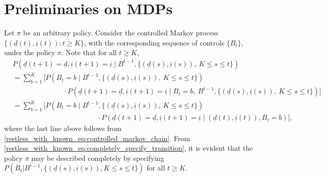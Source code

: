 \section{Preliminaries on MDPs}\label{restless_with_known_sec:MDP_preliminaries}
Let $\pi$ be an arbitrary policy. Consider the controlled Markov process $\{(\underline{d}(t),\underline{i}(t)):t\geq K\}$, with the corresponding sequence of controls $\{B_t\}$, under the policy $\pi$. Note that for all $t\geq K$,
\begin{align}
	&P(\underline{d}(t+1)=\underline{d},\underline{i}(t+1)=\underline{i}\mid B^{t-1}, \{(\underline{d}(s),\underline{i}(s)),~K\leq s\leq t\})\nonumber\\
	&=\sum\limits_{b=1}^{K}\bigg[P(B_t=b\mid B^{t-1}, \{(\underline{d}(s),\underline{i}(s)),~K\leq s\leq t\})\nonumber\\
	&\hspace{3cm} \cdot P(\underline{d}(t+1)=\underline{d},\underline{i}(t+1)=\underline{i}\mid B_t=b, ~B^{t-1}, \{(\underline{d}(s),\underline{i}(s)),~K\leq s\leq t\})\bigg]\nonumber\\
	&=\sum\limits_{b=1}^{K}\bigg[P(B_t=b\mid B^{t-1},\{(\underline{d}(s),\underline{i}(s)),~K\leq s\leq t\})\nonumber\\
	&\hspace{5cm}\cdot P(\underline{d}(t+1)=\underline{d},\underline{i}(t+1)=\underline{i}\mid (\underline{d}(t),\underline{i}(t)), B_t=b)\bigg],\label{restless_with_known_eq:completely_specify_transition}
\end{align}
where the last line above follows from \eqref{restless_with_known_eq:controlled_markov_chain}. From \eqref{restless_with_known_eq:completely_specify_transition}, it is evident that the policy $\pi$ may be described completely by specifying  $P(B_{t} | B^{t-1}, \{ (\underline{d}(s),\underline{i}(s)),K\leq s\leq t \})$ for all $t\geq K$. 
